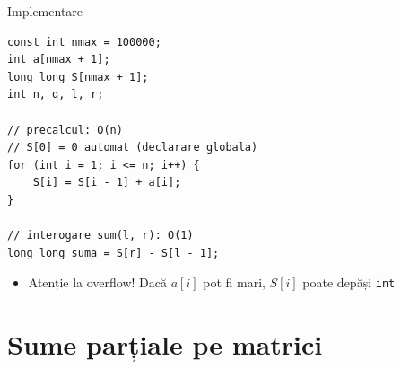 \documentclass{beamer}
\begin{document}
\begin{frame}{Implementare}
  \begin{lstlisting}
const int nmax = 100000;
int a[nmax + 1];
long long S[nmax + 1];
int n, q, l, r;

// precalcul: O(n)
// S[0] = 0 automat (declarare globala)
for (int i = 1; i <= n; i++) {
    S[i] = S[i - 1] + a[i];
}

// interogare sum(l, r): O(1)
long long suma = S[r] - S[l - 1];
  \end{lstlisting}

  \begin{itemize}
    \item \alert{Atenție la overflow!} Dacă $a[i]$ pot fi mari, $S[i]$ poate depăși \texttt{int}
  \end{itemize}
\end{frame}

\section{Sume parțiale pe matrici}
\end{document}
